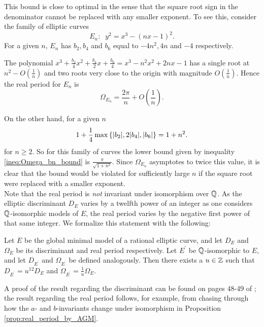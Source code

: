 \documentclass[10pt]{article}
\newcommand{\pr}{^{\prime}}
\begin{document}
This bound is close to optimal in the sense that the square root sign in the denominator cannot be replaced with any smaller exponent. To see this, consider the family of elliptic curves
\begin{equation}
E_n: \;\; y^2 = x^3 - (nx-1)^2.
\end{equation}
For a given $n$, $E_n$ has $b_2,b_4$ and $b_6$ equal to $-4n^2,4n$ and $-4$ respectively.

The polynomial $x^3 + \frac{b_2}{4} x^2 + \frac{b_4}{2} x + \frac{b_6}{4} = x^3 -n^2 x^2 + 2n x - 1$ has a single root at $n^2 - O(\frac{1}{n})$ and two roots very close to the origin with magnitude $O(\frac{1}{n})$. Hence the real period for $E_n$ is
\begin{equation}
\Omega_{E_n} = \frac{2\pi}{n} + O\left(\frac{1}{n}\right).
\end{equation}

On the other hand, for a given $n$
\begin{equation}
1+\frac{1}{4}\max\left\{|b_2|,2|b_4|,|b_6|\right\} = 1+n^2.
\end{equation}
for $n\ge 2$. So for this family of curves the lower bound given by inequality \ref{ineq:Omega_bn_bound} is $\frac{\pi}{\sqrt{1+n^2}}$. Since $\Omega_{E_n}$ asymptotes to twice this value, it is clear that the bound would be violated for sufficiently large $n$ if the square root were replaced with a smaller exponent. \\

Note that the real period is {\it not} invariant under isomorphism over $\mathbb{Q}$. As the elliptic discriminant $D_E$ varies by a twelfth power of an integer as one considers $\mathbb{Q}$-isomorphic models of $E$, the real period varies by the negative first power of that same integer. We formalize this statement with the following:
\begin{lemma}
Let $E$ be the global minimal model of a rational elliptic curve, and let $D_E$ and $\Omega_E$ be its discriminant and real period respectively. Let $E\pr$ be $\mathbb{Q}$-isomorphic to $E$, and let $D_{E^{\pr}}$ and $\Omega_{E^{\pr}}$ be defined analogously. Then there exists a $u \in \mathbb{Z}$ such that $D_{E^{\pr}}=u^{12} D_E$ and $\Omega_{E^{\pr}}=\frac{1}{u}\Omega_E$.
\end{lemma}
A proof of the result regarding the discriminant can be found on pages 48-49 of \cite{Sil-1985}; the result regarding the real period follows, for example, from chasing through how the $a$- and $b$-invariants change under isomorphism in Proposition \ref{prop:real_period_by_AGM}. \\
\end{document}
